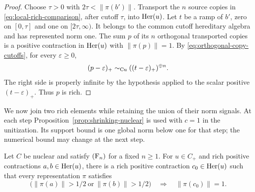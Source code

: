 \begin{proof}
Choose \(\tau>0\) with \(2\tau<\|\pi(b')\|\).  Transport the
\(n\) source copies in \eqref{eq:local-rich-comparison}, after cutoff
\(\tau\), into \(\operatorname{Her}(u)\).  Let \(t\) be a ramp of \(b'\), zero
on \([0,\tau]\) and one on \([2\tau,\infty)\).  It belongs to the
common cutoff hereditary algebra and has represented norm one.
The sum \(p\) of its \(n\) orthogonal transported copies is a
positive contraction in \(\operatorname{Her}(u)\) with \(\|\pi(p)\|=1\).
By \eqref{eq:orthogonal-copy-cutoffs}, for every \(\varepsilon\ge0\),
\[
 (p-\varepsilon)_+\sim_{\mathrm{Cu}}((t-\varepsilon)_+)^{\oplus n}.
\]
The right side is properly infinite by the hypothesis applied to
the scalar positive \((t-\varepsilon)_+\).  Thus \(p\) is rich.
\end{proof}

We now join two rich elements while retaining the union of their
norm signals.  At each step Proposition~\ref{prop:shrinking-nuclear}
is used with \(c=1\) in the unitization.  Its support bound is one
global norm below one for that step; the numerical bound may change
at the next step.

\begin{lemma}\label{lem:merger}
Let \(C\) be nuclear and satisfy \(\textup{(F\ensuremath{_n})}\) for a fixed \(n\ge1\).
For \(u\in C_+\) and rich positive contractions \(a,b\in\operatorname{Her}(u)\),
there is a rich positive contraction \(c_0\in\operatorname{Her}(u)\) such that
every representation \(\pi\) satisfies
\begin{equation}\label{eq:merger-signal}
 \bigl(\|\pi(a)\|>1/2\ \text{or}\ \|\pi(b)\|>1/2\bigr)
 \quad\Longrightarrow\quad\|\pi(c_0)\|=1.
\end{equation}
\end{lemma}

